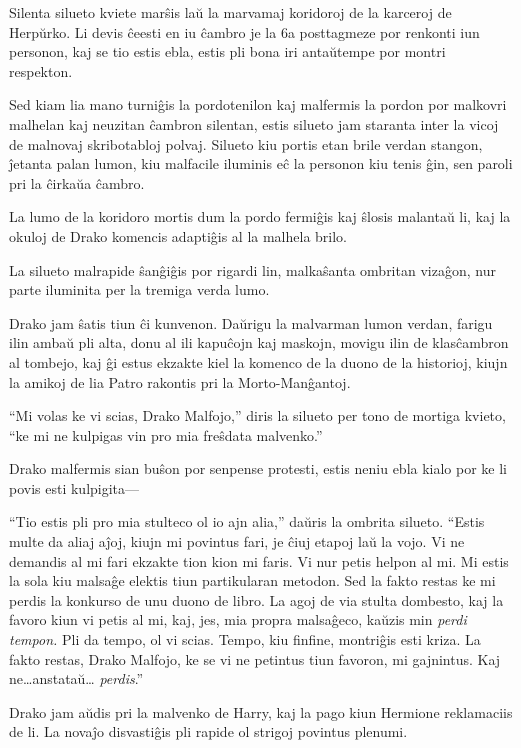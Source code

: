 Silenta silueto kviete marŝis laŭ la marvamaj koridoroj de la karceroj
de Herpŭrko. Li devis ĉeesti en iu ĉambro je la 6a posttagmeze por
renkonti iun personon, kaj se tio estis ebla, estis pli bona iri
antaŭtempe por montri respekton.

Sed kiam lia mano turniĝis la pordotenilon kaj malfermis la pordon por
malkovri malhelan kaj neuzitan ĉambron silentan, estis silueto jam
staranta inter la vicoj de malnovaj skribotabloj polvaj. Silueto kiu
portis etan brile verdan stangon, ĵetanta palan lumon, kiu malfacile
iluminis eĉ la personon kiu tenis ĝin, sen paroli pri la ĉirkaŭa
ĉambro.

La lumo de la koridoro mortis dum la pordo fermiĝis kaj ŝlosis
malantaŭ li, kaj la okuloj de Drako komencis adaptiĝis al la malhela
brilo.

La silueto malrapide ŝanĝiĝis por rigardi lin, malkaŝanta ombritan
vizaĝon, nur parte iluminita per la tremiga verda lumo.

Drako jam ŝatis tiun ĉi kunvenon. Daŭrigu la malvarman lumon verdan,
farigu ilin ambaŭ pli alta, donu al ili kapuĉojn kaj maskojn, movigu
ilin de klasĉambron al tombejo, kaj ĝi estus ekzakte kiel la komenco
de la duono de la historioj, kiujn la amikoj de lia Patro rakontis pri
la Morto-Manĝantoj.

``Mi volas ke vi scias, Drako Malfojo,'' diris la silueto per tono de
mortiga kvieto, ``ke mi ne kulpigas vin pro mia freŝdata malvenko.''

Drako malfermis sian buŝon por senpense protesti, estis neniu ebla
kialo por ke li povis esti kulpigita—

``Tio estis pli pro mia stulteco ol io ajn alia,'' daŭris la ombrita
silueto. ``Estis multe da aliaj aĵoj, kiujn mi povintus fari, je ĉiuj
etapoj laŭ la vojo. Vi ne demandis al mi fari ekzakte tion kion mi
faris. Vi nur petis helpon al mi. Mi estis la sola kiu malsaĝe elektis
tiun partikularan metodon. Sed la fakto restas ke mi perdis la
konkurso de unu duono de libro. La agoj de via stulta dombesto, kaj la
favoro kiun vi petis al mi, kaj, jes, mia propra malsaĝeco, kaŭzis min
\emph{perdi tempon.} Pli da tempo, ol vi scias. Tempo, kiu finfine,
montriĝis esti kriza. La fakto restas, Drako Malfojo, ke se vi ne
petintus tiun favoron, mi gajnintus. Kaj ne\ldots anstataŭ\ldots
\emph{perdis}.''

Drako jam aŭdis pri la malvenko de Harry, kaj la pago kiun Hermione
reklamaciis de li. La novaĵo disvastiĝis pli rapide ol strigoj
povintus plenumi.

